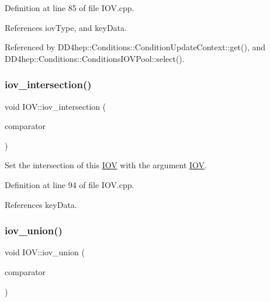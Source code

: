 Definition at line 85 of file I\+O\+V.\+cpp.



References iov\+Type, and key\+Data.



Referenced by D\+D4hep\+::\+Conditions\+::\+Condition\+Update\+Context\+::get(), and D\+D4hep\+::\+Conditions\+::\+Conditions\+I\+O\+V\+Pool\+::select().

\hypertarget{class_d_d4hep_1_1_i_o_v_ab045b2ff365c11e6ff93c4ca01270a49}{}\label{class_d_d4hep_1_1_i_o_v_ab045b2ff365c11e6ff93c4ca01270a49} 
\subsubsection{\texorpdfstring{iov\+\_\+intersection()}{iov\_intersection()}\hspace{0.1cm}{\footnotesize\ttfamily [2/2]}}
{\footnotesize\ttfamily void I\+O\+V\+::iov\+\_\+intersection (\begin{DoxyParamCaption}\item[{const \hyperlink{class_d_d4hep_1_1_i_o_v_a07cb46dc875296dc9cccf4ff370104ae}{I\+O\+V\+::\+Key} \&}]{comparator }\end{DoxyParamCaption})}



Set the intersection of this \hyperlink{class_d_d4hep_1_1_i_o_v}{I\+OV} with the argument \hyperlink{class_d_d4hep_1_1_i_o_v}{I\+OV}. 



Definition at line 94 of file I\+O\+V.\+cpp.



References key\+Data.

\hypertarget{class_d_d4hep_1_1_i_o_v_aa0261c65bd7ffa708862bdd0e69845d9}{}\label{class_d_d4hep_1_1_i_o_v_aa0261c65bd7ffa708862bdd0e69845d9} 
\subsubsection{\texorpdfstring{iov\+\_\+union()}{iov\_union()}\hspace{0.1cm}{\footnotesize\ttfamily [1/2]}}
{\footnotesize\ttfamily void I\+O\+V\+::iov\+\_\+union (\begin{DoxyParamCaption}\item[{const \hyperlink{class_d_d4hep_1_1_i_o_v}{I\+OV} \&}]{comparator }\end{DoxyParamCaption})}



